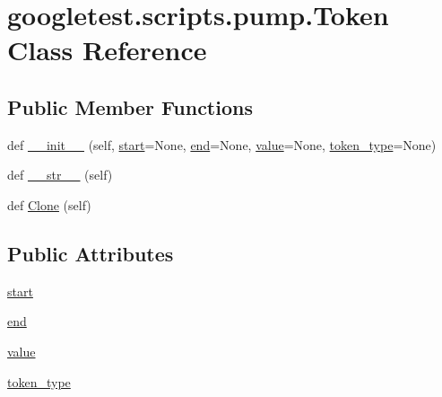 \hypertarget{classgoogletest_1_1scripts_1_1pump_1_1_token}{}\section{googletest.\+scripts.\+pump.\+Token Class Reference}
\label{classgoogletest_1_1scripts_1_1pump_1_1_token}
\subsection*{Public Member Functions}
\begin{DoxyCompactItemize}
\item 
def \mbox{\hyperlink{classgoogletest_1_1scripts_1_1pump_1_1_token_a437e6b5cf6101dfd30b96e72232d5c36}{\+\_\+\+\_\+init\+\_\+\+\_\+}} (self, \mbox{\hyperlink{classgoogletest_1_1scripts_1_1pump_1_1_token_adf0a7efaaed3a1659e3fc19e4f293596}{start}}=None, \mbox{\hyperlink{classgoogletest_1_1scripts_1_1pump_1_1_token_a0b9f94d88e036beee8f5b0e739f1a5fd}{end}}=None, \mbox{\hyperlink{classgoogletest_1_1scripts_1_1pump_1_1_token_a5ffb04f116b6a260849e08c4c5cb2b76}{value}}=None, \mbox{\hyperlink{classgoogletest_1_1scripts_1_1pump_1_1_token_a06b838a494f0c2bc6430af3bb272986c}{token\+\_\+type}}=None)
\item 
def \mbox{\hyperlink{classgoogletest_1_1scripts_1_1pump_1_1_token_a5ac4cfd8330080d14fef8bae02398c45}{\+\_\+\+\_\+str\+\_\+\+\_\+}} (self)
\item 
def \mbox{\hyperlink{classgoogletest_1_1scripts_1_1pump_1_1_token_ab770f293362432c5bab31cbc61bf4d61}{Clone}} (self)
\end{DoxyCompactItemize}
\subsection*{Public Attributes}
\begin{DoxyCompactItemize}
\item 
\mbox{\hyperlink{classgoogletest_1_1scripts_1_1pump_1_1_token_adf0a7efaaed3a1659e3fc19e4f293596}{start}}
\item 
\mbox{\hyperlink{classgoogletest_1_1scripts_1_1pump_1_1_token_a0b9f94d88e036beee8f5b0e739f1a5fd}{end}}
\item 
\mbox{\hyperlink{classgoogletest_1_1scripts_1_1pump_1_1_token_a5ffb04f116b6a260849e08c4c5cb2b76}{value}}
\item 
\mbox{\hyperlink{classgoogletest_1_1scripts_1_1pump_1_1_token_a06b838a494f0c2bc6430af3bb272986c}{token\+\_\+type}}
\end{DoxyCompactItemize}


